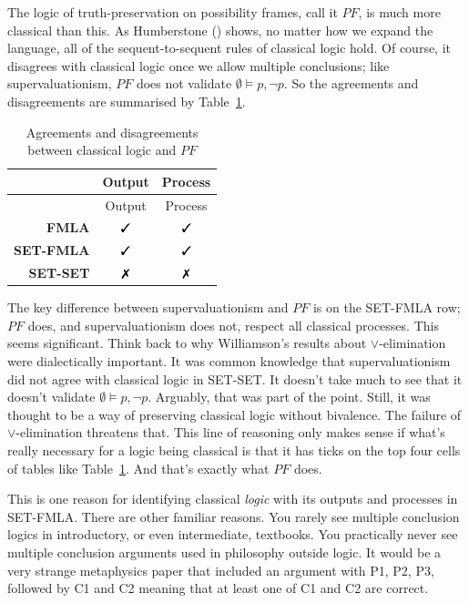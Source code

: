 \documentclass[
  11pt,
  letterpaper,
  DIV=11,
  numbers=noendperiod,
  twoside]{scrartcl}
\newcommand{\tick}{\text{\ding{51}}}
\newcommand{\cross}{\text{\ding{55}}}
\begin{document}
The logic of truth-preservation on possibility frames, call it \(PF\),
is much more classical than this. As Humberstone
() shows, no matter how we expand
the language, all of the sequent-to-sequent rules of classical logic
hold. Of course, it disagrees with classical logic once we allow
multiple conclusions; like supervaluationism, \(PF\) does not validate
\(\emptyset \vDash p, \neg p\). So the agreements and disagreements are
summarised by Table~\ref{tbl-pf}.

\begin{longtable}[]{@{}rcc@{}}
\caption{Agreements and disagreements between classical logic and
\(PF\)}\label{tbl-pf}\tabularnewline
\toprule\noalign{}
& Output & Process \\
\midrule\noalign{}
\endfirsthead
\toprule\noalign{}
& Output & Process \\
\midrule\noalign{}
\endhead
\bottomrule\noalign{}
\endlastfoot
\textbf{FMLA} & \(\tick\) & \(\tick\) \\
\textbf{SET-FMLA} & \(\tick\) & \(\tick\) \\
\textbf{SET-SET} & \(\cross\) & \(\cross\) \\
\end{longtable}

The key difference between supervaluationism and \(PF\) is on the
SET-FMLA row; \(PF\) does, and supervaluationism does not, respect all
classical processes. This seems significant. Think back to why
Williamson's results about \(\vee\)-elimination were dialectically
important. It was common knowledge that supervaluationism did not agree
with classical logic in SET-SET. It doesn't take much to see that it
doesn't validate \(\emptyset \vDash p, \neg p\). Arguably, that was part
of the point. Still, it was thought to be a way of preserving classical
logic without bivalence. The failure of \(\vee\)-elimination threatens
that. This line of reasoning only makes sense if what's really necessary
for a logic being classical is that it has ticks on the top four cells
of tables like Table~\ref{tbl-pf}. And that's exactly what \(PF\) does.

This is one reason for identifying classical \emph{logic} with its
outputs and processes in SET-FMLA. There are other familiar reasons. You
rarely see multiple conclusion logics in introductory, or even
intermediate, textbooks. You practically never see multiple conclusion
arguments used in philosophy outside logic. It would be a very strange
metaphysics paper that included an argument with P1, P2, P3, followed by
C1 and C2 meaning that at least one of C1 and C2 are correct.
\end{document}
